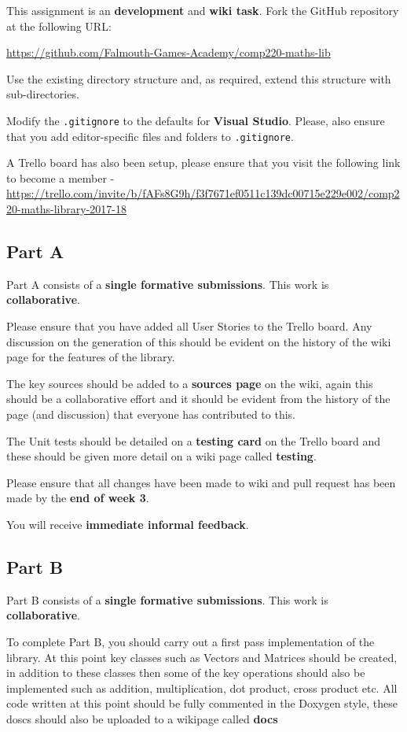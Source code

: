 \documentclass{../../fal_assignment}
\begin{document}
This assignment is an \textbf{development} and \textbf{wiki task}. Fork the GitHub repository at the following URL:

\indent \url{https://github.com/Falmouth-Games-Academy/comp220-maths-lib}

Use the existing directory structure and, as required, extend this structure with sub-directories.

Modify the \texttt{.gitignore} to the defaults for \textbf{Visual Studio}. Please, also ensure that you add editor-specific files and folders to \texttt{.gitignore}. 

A Trello board has also been setup, please ensure that you visit the following link to become a member - \url{https://trello.com/invite/b/fAFs8G9h/f3f7671ef0511c139dc00715e229e002/comp220-maths-library-2017-18}

\subsection*{Part A}

Part A consists of a \textbf{single formative submissions}. This work is \textbf{collaborative}.

Please ensure that you have added all User Stories to the Trello board. Any discussion on the generation of this should be evident on the history of the wiki page for the features of the library.

The key sources should be added to a \textbf{sources page} on the wiki, again this should be a collaborative effort and it should be evident from the history of the page (and discussion) that everyone has contributed to this.

The Unit tests should be detailed on a \textbf{testing card} on the Trello board and these should be given more detail on a wiki page called \textbf{testing}.

Please ensure that all changes have been made to wiki and pull request has been made by the \textbf{end of week 3}. 

You will receive \textbf{immediate informal feedback}.

\subsection*{Part B}

Part B consists of a \textbf{single formative submissions}. This work is \textbf{collaborative}.

To complete Part B, you should carry out a first pass implementation of the library. At this point key classes such as Vectors and Matrices should be created, in addition to these classes then some of the key operations should also be implemented such as addition, multiplication, dot product, cross product etc. All code written at this point should be fully commented in the Doxygen style, these doscs should also be uploaded to a wikipage called \textbf{docs} 
\end{document}
